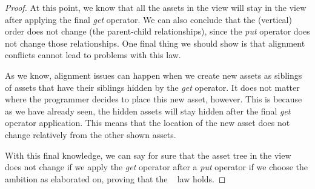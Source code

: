 \begin{proof}
  At this point, we know that all the assets in the view will stay in the view
  after applying the final \emph{get} operator. We can also conclude that the
  (vertical) order does not change (the parent-child relationships), since the
  \emph{put} operator does not change those relationships. One final thing we
  should show is that alignment conflicts cannot lead to problems with this law.

  As we know, alignment issues can happen when we create new assets as siblings
  of assets that have their siblings hidden by the \emph{get} operator. It does
  not matter where the programmer decides to place this new asset, however. This
  is because as we have already seen, the hidden assets will stay hidden after
  the final \emph{get} operator application. This means that the location of the
  new asset does not change relatively from the other shown assets.

  With this final knowledge, we can say for sure that the asset tree in the view
  does not change if we apply the \emph{get} operator after a \emph{put} operator
  if we choose the ambition as elaborated on, proving that the \putget~ law holds.
\end{proof}